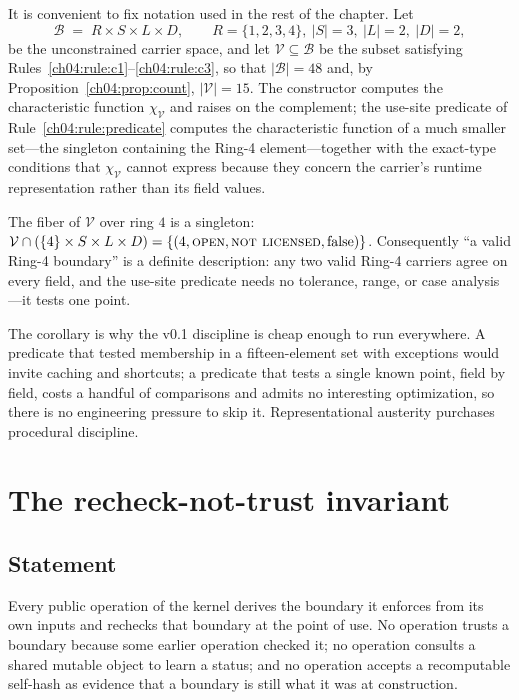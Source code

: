It is convenient to fix notation used in the rest of the chapter. Let
\[
\mathcal{B} \;=\; R \times S \times L \times D, \qquad
R = \{1,2,3,4\},\ |S| = 3,\ |L| = 2,\ |D| = 2,
\]
be the unconstrained carrier space, and let
$\mathcal{V} \subseteq \mathcal{B}$ be the subset satisfying
Rules~\ref{ch04:rule:c1}--\ref{ch04:rule:c3}, so that
$|\mathcal{B}| = 48$ and, by Proposition~\ref{ch04:prop:count},
$|\mathcal{V}| = 15$. The constructor computes the characteristic
function $\chi_{\mathcal{V}}$ and raises on the complement; the use-site
predicate of Rule~\ref{ch04:rule:predicate} computes the characteristic
function of a much smaller set---the singleton containing the Ring-4
element---together with the exact-type conditions that
$\chi_{\mathcal{V}}$ cannot express because they concern the carrier's
runtime representation rather than its field values.

\begin{corollary}
\label{ch04:cor:unique}
The fiber of $\mathcal{V}$ over ring $4$ is a singleton:
$\mathcal{V} \cap (\{4\} \times S \times L \times D) =
\{(4, \text{\textsc{open}}, \text{\textsc{not licensed}},
\mathrm{false})\}$.
Consequently ``a valid Ring-4 boundary'' is a definite description: any
two valid Ring-4 carriers agree on every field, and the use-site
predicate needs no tolerance, range, or case analysis---it tests one
point.
\end{corollary}

The corollary is why the v0.1 discipline is cheap enough to run
everywhere. A predicate that tested membership in a fifteen-element set
with exceptions would invite caching and shortcuts; a predicate that
tests a single known point, field by field, costs a handful of
comparisons and admits no interesting optimization, so there is no
engineering pressure to skip it. Representational austerity purchases
procedural discipline.

\section{The recheck-not-trust invariant}\label{ch04:recheck}

\subsection{Statement}

\begin{invariant}\label{ch04:inv:recheck}
Every public operation of the kernel derives the boundary it enforces from
its own inputs and rechecks that boundary at the point of use. No operation
trusts a boundary because some earlier operation checked it; no operation
consults a shared mutable object to learn a status; and no operation accepts
a recomputable self-hash as evidence that a boundary is still what it was at
construction.
\end{invariant}

